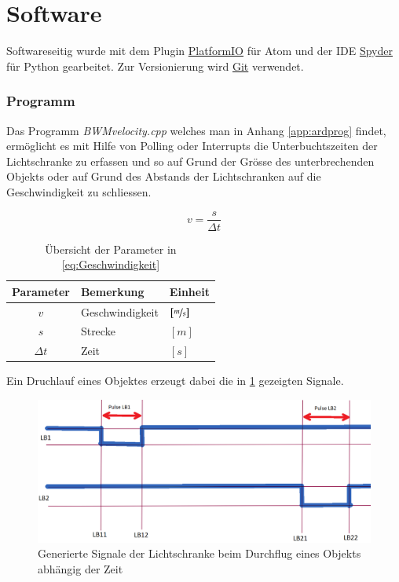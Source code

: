 \part{Software}
Softwareseitig wurde mit dem Plugin \href{https://platformio.org/platformio-ide}{PlatformIO} für Atom und der IDE \href{https://www.spyder-ide.org}{Spyder} für Python gearbeitet. Zur Versionierung wird \href{https://git-scm.com/}{Git} verwendet.
\section{Programm}
Das Programm \textit{BWMvelocity.cpp} welches man in Anhang \ref{app:ardprog} findet, ermöglicht es mit Hilfe von Polling oder Interrupts die Unterbuchtszeiten der Lichtschranke zu erfassen und so auf Grund der Grösse des unterbrechenden Objekts oder auf Grund des Abstands der Lichtschranken auf die Geschwindigkeit zu schliessen.

\begin{equation}\label{eq:Geschwindigkeit}
    v = \frac{s}{\varDelta t}
\end{equation}

\begin{table}[h] 
    \centering
    \begin{tabular}{cll}
        Parameter&Bemerkung&Einheit\\
        \hline
        $v$& Geschwindigkeit&$\left[\nicefrac{m}{s}\right]$\\
        $s$& Strecke&$\left[m\right]$\\
        $ \varDelta t$& Zeit&$\left[s\right]$\\
    \end{tabular}
    \caption{Übersicht der Parameter in \ref{eq:Geschwindigkeit}}
\end{table}

Ein Druchlauf  eines Objektes erzeugt dabei die in \ref{fig:ArdSigs} gezeigten Signale.
\begin{figure}[ht]
    \centering
    \includegraphics[width=\textwidth]{images/signals}
    \caption{Generierte Signale der Lichtschranke beim Durchflug eines Objekts abhängig der Zeit}
    \label{fig:ArdSigs}
\end{figure}


